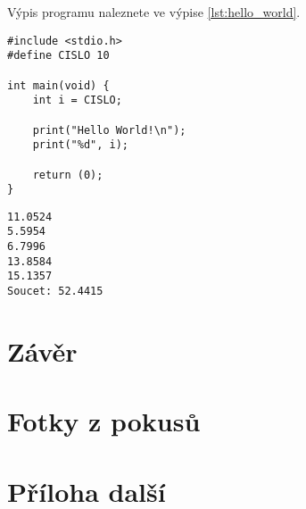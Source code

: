 \documentclass[12pt]{report}			%
\begin{document}
Výpis programu   naleznete ve výpise \ref{lst:hello_world}.

\begin{lstlisting}[title={Program hello.c}, caption={hello.c}, label={lst:hello_world}]
#include <stdio.h>
#define CISLO 10

int main(void) {
	int i = CISLO;

	print("Hello World!\n");
	print("%d", i);

	return (0);
}
\end{lstlisting}

\lipsum[1]	

\begin{lstlisting}[numbers=none, title={Příklad výstupního souboru}]
11.0524
5.5954
6.7996
13.8584
15.1357
Soucet: 52.4415
\end{lstlisting}

	\chapter*{Závěr}
	
		\lipsum[1]
	
	\nocite{*}
    	\printbibliography					%
    \printglossary[title={Zkratky}]		%
    \listoffigures						%
    \listoftables						%

    \begin{appendices}
	\chapter{Fotky z pokusů}	
	\lipsum[1]
	\chapter{Příloha další }
	\end{appendices}
\end{document}
